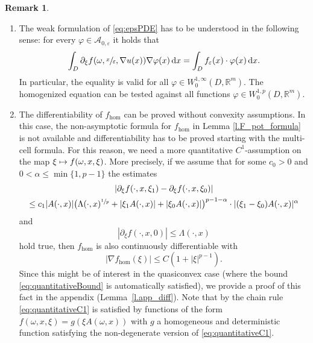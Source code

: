 \documentclass[10pt]{amsart}
\newenvironment{enumeratea}
{\bgroup\def\theenumi{\alph{enumi}}\begin{enumerate}}
{\end{enumerate}\egroup}
\def\mto{\mathchoice{\longmapsto}{\mapsto}{\mapsto}{\mapsto}}
\theoremstyle{definition}
\newtheorem{remark}[theorem]{Remark}
\let\e\varepsilon
\let\w\omega
\newcommand{\dx}{\,\mathrm{d}x}
\newcommand{\R}{\mathbb{R}}
\begin{document}
\skpt
\begin{remark}\label{r.weaksol}
\begin{enumeratea}
\item
The weak formulation of \eqref{eq:epsPDE} has to be understood in the following sense: for every $\varphi\in\mathcal{A}_{0,\e}$ it holds that
\begin{equation*}
\int_D \partial_{\xi}f(\w,\sfrac{x}{\e},\nabla u(x)) \nabla\varphi(x)\dx=\int_D f_{\e}(x)\cdot\varphi(x)\dx.
\end{equation*}
In particular, the equality is valid for all $\varphi\in W^{1,\infty}_0(D,\R^m)$. The homogenized equation can be tested against all functions $\varphi\in W^{1,p}_0(D,\R^m)$.

\item
The differentiability of $f_{\hom}$ can be proved without convexity assumptions. In this case, the non-asymptotic formula for $f_{\hom}$ in Lemma \ref{l.F_pot_formula} is not available and differentiability has to be proved starting with the multi-cell formula. For this reason, we need a more quantitative $C^1$-assumption on the map $\xi\mto f(\w,x,\xi)$. More precisely, if we assume that for some $c_0>0$ and $0<\alpha\leq\min\{1,p-1\}$ the estimates
\begin{multline}\label{eq:quantitativeC1}
| \partial_{\xi}f(\cdot,x,\xi_1)-\partial_{\xi}f(\cdot,x,\xi_0)|\\
\leq c_1|A(\cdot,x)|\bigl(\Lambda(\cdot,x)^{\sfrac{1}{p}}+|\xi_1A(\cdot,x)|+|\xi_0A(\cdot,x)|\bigr)^{p-1-\alpha}
\cdot|(\xi_1-\xi_0)A(\cdot,x)|^{\alpha}
\end{multline}
and
\begin{equation}\label{eq:quantitativeBound}
|\partial_{\xi}f(\cdot,x,0)|\leq\Lambda(\cdot,x)
\end{equation}
hold true, then $f_{\hom}$ is also continuously differentiable with
\[
|\nabla f_{\hom}(\xi)|\leq C(1+|\xi|^{p-1}).
\]
Since this might be of interest in the quasiconvex case (where the bound \eqref{eq:quantitativeBound} is automatically satisfied), we provide a proof of this fact in the appendix (\cf Lemma~\ref{l.app_diff}). Note that by the chain rule \eqref{eq:quantitativeC1} is satisfied by functions of the form $f(\w,x,\xi)=g(\xi A(\w,x))$ with $g$ a homogeneous and deterministic function satisfying the non-degenerate version of \eqref{eq:quantitativeC1}.


\end{enumeratea}
\end{remark}
\end{document}
